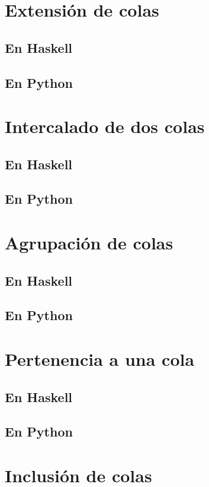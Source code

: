 \documentclass[a4paper,12pt,twoside]{book}
\begin{document}
\section{Extensión de colas}
\subsection{En Haskell}
\subsection{En Python}

\section{Intercalado de dos colas}
\subsection{En Haskell}
\subsection{En Python}

\section{Agrupación de colas}
\subsection{En Haskell}
\subsection{En Python}

\section{Pertenencia a una cola}
\subsection{En Haskell}
\subsection{En Python}

\section{Inclusión de colas}
\end{document}
